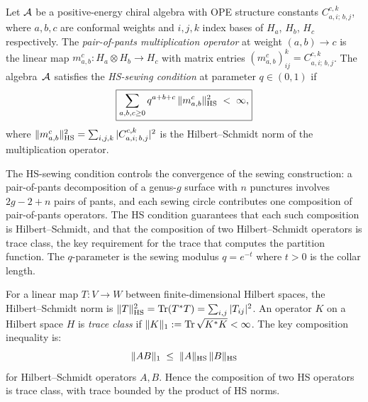 \begin{definition}
\label{def:thqg-I-hs-sewing}
Let $\mathcal{A}$ be a positive-energy chiral algebra with OPE structure constants $C^{c,k}_{a,i;\,b,j}$, where $a,b,c$ are conformal weights and $i,j,k$ index bases of $H_a$, $H_b$, $H_c$ respectively. The \emph{pair-of-pants multiplication operator} at weight $(a,b) \to c$ is the linear map $m^c_{a,b} \colon H_a \otimes H_b \to H_c$ with matrix entries $(m^c_{a,b})_{ij}^k = C^{c,k}_{a,i;\,b,j}$. The algebra~$\mathcal{A}$ satisfies the \emph{HS-sewing condition} at parameter $q \in (0,1)$ if
\begin{equation}%
\boxed{ \sum_{a,b,c \geq 0} q^{a+b+c}\, \|m^c_{a,b}\|_{\HS}^2 \;<\; \infty,}
\end{equation}
where $\|m^c_{a,b}\|_{\operatorname{HS}}^2 = \sum_{i,j,k} |C^{c,k}_{a,i;\,b,j}|^2$ is the Hilbert--Schmidt norm of the multiplication operator.
\end{definition}

\begin{remark}
The HS-sewing condition controls the convergence of the sewing construction: a pair-of-pants decomposition of a genus-$g$ surface with $n$ punctures involves $2g - 2 + n$ pairs of pants, and each sewing circle contributes one composition of pair-of-pants operators. The HS condition guarantees that each such composition is Hilbert--Schmidt, and that the composition of two Hilbert--Schmidt operators is trace class, the key requirement for the trace that computes the partition function. The $q$-parameter is the sewing modulus $q = e^{-t}$ where $t > 0$ is the collar length.
\end{remark}

\begin{definition}
For a linear map $T \colon V \to W$ between finite-dimensional Hilbert spaces, the Hilbert--Schmidt norm is $\|T\|_{\operatorname{HS}}^2 = \operatorname{Tr}(T^*T) = \sum_{i,j} |T_{ij}|^2$. An operator $K$ on a Hilbert space $H$ is \emph{trace class} if $\|K\|_1 := \operatorname{Tr}\sqrt{K^*K} < \infty$. The key composition inequality is:
\begin{equation}%
\|AB\|_1 \;\leq\; \|A\|_{\HS}\,\|B\|_{\HS}
\end{equation}
for Hilbert--Schmidt operators $A, B$. Hence the composition of two HS operators is trace class, with trace bounded by the product of HS norms.
\end{definition}

